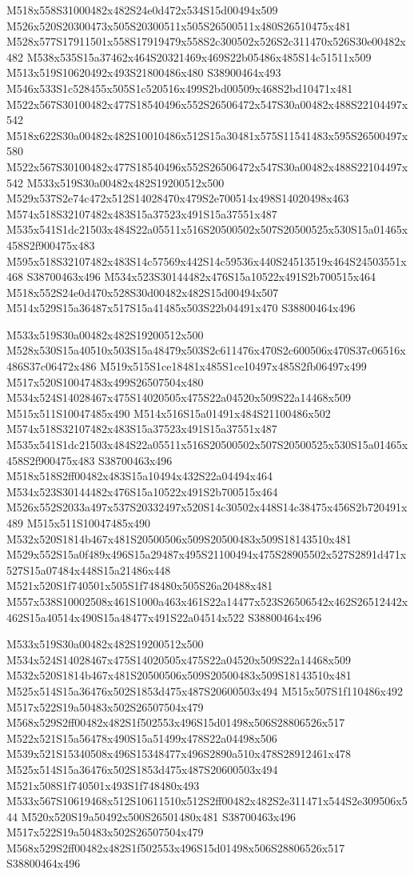\documentclass{article}
\begin{document}
\begin{multicols}{2}
M518x558S31000482x482S24e0d472x534S15d00494x509 M526x520S20300473x505S20300511x505S26500511x480S26510475x481 M528x577S17911501x558S17919479x558S2c300502x526S2c311470x526S30e00482x482 M538x535S15a37462x464S20321469x469S22b05486x485S14c51511x509 M513x519S10620492x493S21800486x480 S38900464x493 M546x533S1c528455x505S1c520516x499S2bd00509x468S2bd10471x481 M522x567S30100482x477S18540496x552S26506472x547S30a00482x488S22104497x542 M518x622S30a00482x482S10010486x512S15a30481x575S11541483x595S26500497x580 M522x567S30100482x477S18540496x552S26506472x547S30a00482x488S22104497x542 M533x519S30a00482x482S19200512x500 M529x537S2e74c472x512S14028470x479S2e700514x498S14020498x463 M574x518S32107482x483S15a37523x491S15a37551x487 M535x541S1dc21503x484S22a05511x516S20500502x507S20500525x530S15a01465x458S2f900475x483 M595x518S32107482x483S14c57569x442S14c59536x440S24513519x464S24503551x468 S38700463x496 M534x523S30144482x476S15a10522x491S2b700515x464 M518x552S24e0d470x528S30d00482x482S15d00494x507 M514x529S15a36487x517S15a41485x503S22b04491x470 S38800464x496

M533x519S30a00482x482S19200512x500 M528x530S15a40510x503S15a48479x503S2c611476x470S2c600506x470S37c06516x486S37c06472x486 M519x515S1ce18481x485S1ce10497x485S2fb06497x499 M517x520S10047483x499S26507504x480 M534x524S14028467x475S14020505x475S22a04520x509S22a14468x509 M515x511S10047485x490 M514x516S15a01491x484S21100486x502 M574x518S32107482x483S15a37523x491S15a37551x487 M535x541S1dc21503x484S22a05511x516S20500502x507S20500525x530S15a01465x458S2f900475x483 S38700463x496 M518x518S2ff00482x483S15a10494x432S22a04494x464 M534x523S30144482x476S15a10522x491S2b700515x464 M526x552S2033a497x537S20332497x520S14c30502x448S14c38475x456S2b720491x489 M515x511S10047485x490 M532x520S1814b467x481S20500506x509S20500483x509S18143510x481 M529x552S15a0f489x496S15a29487x495S21100494x475S28905502x527S2891d471x527S15a07484x448S15a21486x448 M521x520S1f740501x505S1f748480x505S26a20488x481 M557x538S10002508x461S1000a463x461S22a14477x523S26506542x462S26512442x462S15a40514x490S15a48477x491S22a04514x522 S38800464x496

M533x519S30a00482x482S19200512x500 M534x524S14028467x475S14020505x475S22a04520x509S22a14468x509 M532x520S1814b467x481S20500506x509S20500483x509S18143510x481 M525x514S15a36476x502S1853d475x487S20600503x494 M515x507S1f110486x492 M517x522S19a50483x502S26507504x479 M568x529S2ff00482x482S1f502553x496S15d01498x506S28806526x517 M522x521S15a56478x490S15a51499x478S22a04498x506 M539x521S15340508x496S15348477x496S2890a510x478S28912461x478 M525x514S15a36476x502S1853d475x487S20600503x494 M521x508S1f740501x493S1f748480x493 M533x567S10619468x512S10611510x512S2ff00482x482S2e311471x544S2e309506x544 M520x520S19a50492x500S26501480x481 S38700463x496 M517x522S19a50483x502S26507504x479 M568x529S2ff00482x482S1f502553x496S15d01498x506S28806526x517 S38800464x496


\end{multicols}
\end{document}
